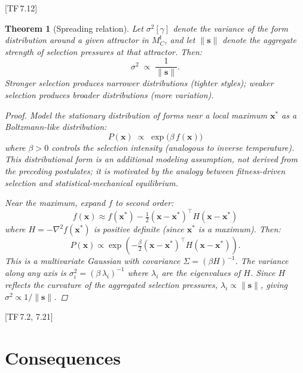 \documentclass[10pt]{article}
\theoremstyle{definition}
\theoremstyle{plain}
\newtheorem{theorem}[definition]{Theorem}
\theoremstyle{remark}
\newcommand{\MC}{M^{\mathsf{I}}_C}          %
\newcommand{\norm}[1]{\lVert #1 \rVert}
\newcommand{\TF}[1]{\textnormal{[TF\,#1]}}  %
\begin{document}
\TF{7.12}

\begin{theorem}[Spreading relation]\label{thm:8.4}
Let $\sigma^2[\gamma]$ denote the variance of the form distribution
around a given attractor in $\MC$, and let $\norm{\bm{s}}$ denote the
aggregate strength of selection pressures at that attractor. Then:
\[
  \sigma^2 \;\propto\; \frac{1}{\norm{\bm{s}}}.
\]
Stronger selection produces narrower distributions (tighter styles);
weaker selection produces broader distributions (more variation).

\begin{proof}
Model the stationary distribution of forms near a local maximum
$\bm{x}^*$ as a Boltzmann-like distribution:
\[
  P(\bm{x}) \;\propto\;
  \exp\!\bigl(\beta \, f(\bm{x})\bigr)
\]
where $\beta > 0$ controls the selection intensity (analogous to
inverse temperature). This distributional form is an additional
modeling assumption, not derived from the preceding postulates;
it is motivated by the analogy between fitness-driven selection
and statistical-mechanical equilibrium.

Near the maximum, expand $f$ to second order:
\[
  f(\bm{x}) \approx f(\bm{x}^*)
  - \tfrac{1}{2}
  (\bm{x} - \bm{x}^*)^\top H (\bm{x} - \bm{x}^*)
\]
where $H = -\nabla^2 f(\bm{x}^*)$ is positive definite (since
$\bm{x}^*$ is a maximum). Then:
\[
  P(\bm{x}) \propto \exp\!\left(
    -\tfrac{\beta}{2}
    (\bm{x} - \bm{x}^*)^\top H
    (\bm{x} - \bm{x}^*)
  \right).
\]
This is a multivariate Gaussian with covariance
$\Sigma = (\beta H)^{-1}$. The variance along any axis is
$\sigma_i^2 = (\beta \, \lambda_i)^{-1}$ where $\lambda_i$ are the
eigenvalues of $H$. Since $H$ reflects the curvature of the aggregated
selection pressures, $\lambda_i \propto \norm{\bm{s}}$, giving
$\sigma^2 \propto 1/\norm{\bm{s}}$. \qedhere
\end{proof}
\end{theorem}

\TF{7.2, 7.21}


\newpage
\section{Consequences}\label{sec:consequences}
\end{document}
